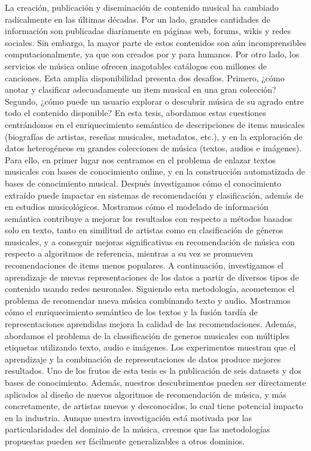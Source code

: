 La creación, publicación y diseminación de contenido musical ha cambiado radicalmente en las últimas décadas. Por un lado, grandes cantidades de información son publicadas diariamente en páginas web, forums, wikis y redes sociales. Sin embargo, la mayor parte de estos contenidos son aún incomprensibles computacionalmente, ya que son creados por y para humanos. Por otro lado, los servicios de música online ofrecen inagotables catálogos con millones de canciones. Esta amplia disponibilidad presenta dos desafíos. Primero, ¿cómo anotar y clasificar adecuadamente un item musical en una gran colección? Segundo, ¿cómo puede un usuario explorar o descubrir música de su agrado entre todo el contenido disponible? En esta tesis, abordamos estas cuestiones centrándonos en el enriquecimiento semántico de descripciones de items musicales (biografías de artistas, reseñas musicales, metadatos, etc.), y en la exploración de datos heterogéneos en grandes colecciones de música (textos, audios e imágenes). Para ello, en primer lugar nos centramos en el problema de enlazar textos musicales con bases de conocimiento online, y en la construcción automatizada de bases de conocimiento musical. Después investigamos cómo el conocimiento extraído puede impactar en sistemas de recomendación y clasificación, además de en estudios musicológicos. Mostramos cómo el modelado de información semántica contribuye a mejorar los resultados con respecto a métodos basados solo en texto, tanto en similitud de artistas como en clasificación de géneros musicales, y a conseguir mejoras significativas en recomendación de música con respecto a algoritmos de referencia, mientras a su vez se promueven recomendaciones de items menos populares. A continuación, investigamos el aprendizaje de nuevas representaciones de los datos a partir de diversos tipos de contenido usando redes neuronales. Siguiendo esta metodología, acometemos el problema de recomendar nueva música combinando texto y audio. Mostramos cómo el enriquecimiento semántico de los textos y la fusión tardía de representaciones aprendidas mejora la calidad de las recomendaciones. Además, abordamos el problema de la classificación de generos musicales con múltiples etiquetas utilizando texto, audio e imágenes. Los experimentos muestran que el aprendizaje y la combinación de representaciones de datos produce mejores resultados. Uno de los frutos de esta tesis es la publicación de seis datasets y dos bases de conocimiento. Además, nuestros descubrimentos pueden ser directamente aplicados al diseño de nuevos algoritmos de recomendación de música, y más concretamente, de artistas nuevos y desconocidos, lo cual tiene potencial impacto en la industria. Aunque nuestra investigación está motivada por las particularidades del dominio de la música, creemos que las metodologías propuestas pueden ser fácilmente generalizables a otros dominios.